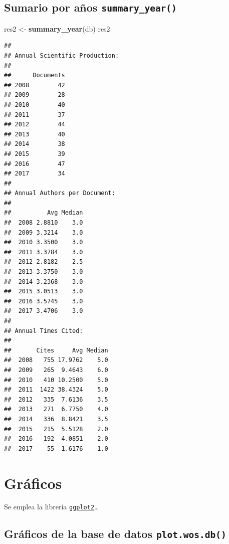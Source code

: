\documentclass[
]{book}
\newenvironment{Shaded}{\begin{snugshade}}{\end{snugshade}}
\newcommand{\KeywordTok}[1]{\textcolor[rgb]{0.13,0.29,0.53}{\textbf{#1}}}
\newcommand{\NormalTok}[1]{#1}
\newcommand{\StringTok}[1]{\textcolor[rgb]{0.31,0.60,0.02}{#1}}
\begin{document}
\hypertarget{sumario-por-auxf1os-summary_year}{%
\subsection{\texorpdfstring{Sumario por años \texttt{summary\_year()}}{Sumario por años summary\_year()}}\label{sumario-por-auxf1os-summary_year}}

\begin{Shaded}
\begin{Highlighting}[]
\NormalTok{res2 <-}\StringTok{ }\KeywordTok{summary_year}\NormalTok{(db)}
\NormalTok{res2}
\end{Highlighting}
\end{Shaded}

\begin{verbatim}
## 
## Annual Scientific Production:
## 
##      Documents
## 2008        42
## 2009        28
## 2010        40
## 2011        37
## 2012        44
## 2013        40
## 2014        38
## 2015        39
## 2016        47
## 2017        34
## 
## Annual Authors per Document:
## 
##          Avg Median
##  2008 2.8810    3.0
##  2009 3.3214    3.0
##  2010 3.3500    3.0
##  2011 3.3784    3.0
##  2012 2.8182    2.5
##  2013 3.3750    3.0
##  2014 3.2368    3.0
##  2015 3.0513    3.0
##  2016 3.5745    3.0
##  2017 3.4706    3.0
## 
## Annual Times Cited:
## 
##       Cites     Avg Median
##  2008   755 17.9762    5.0
##  2009   265  9.4643    6.0
##  2010   410 10.2500    5.0
##  2011  1422 38.4324    5.0
##  2012   335  7.6136    3.5
##  2013   271  6.7750    4.0
##  2014   336  8.8421    3.5
##  2015   215  5.5128    2.0
##  2016   192  4.0851    2.0
##  2017    55  1.6176    1.0
\end{verbatim}

\hypertarget{gruxe1ficos}{%
\section{Gráficos}\label{gruxe1ficos}}

Se emplea la librería \href{https://ggplot2.tidyverse.org}{\texttt{ggplot2}}\ldots{}

\hypertarget{gruxe1ficos-de-la-base-de-datos-plot.wos.db}{%
\subsection{\texorpdfstring{Gráficos de la base de datos \texttt{plot.wos.db()}}{Gráficos de la base de datos plot.wos.db()}}\label{gruxe1ficos-de-la-base-de-datos-plot.wos.db}}
\end{document}
